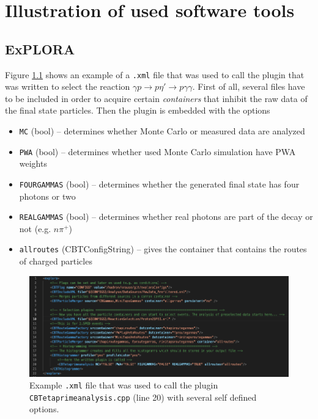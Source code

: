 \chapter{Illustration of used software tools}
\section{ExPLORA}
Figure \ref{fig:xml} shows an example of a \texttt{.xml} file that was used to call the plugin that was written to select the reaction $\gamma p\to p\eta'\to p\gamma\gamma$. First of all, several files have to be included in order to acquire certain \emph{containers} that inhibit the raw data of the final state particles. Then the plugin is embedded with the options 
\begin{itemize}
	\item \texttt{MC} (bool) -- determines whether Monte Carlo or measured data are analyzed 
	\item \texttt{PWA} (bool) -- determines whether used Monte Carlo simulation have PWA weights
	\item \texttt{FOURGAMMAS} (bool) -- determines whether the generated final state has four photons or two
	\item \texttt{REALGAMMAS} (bool) -- determines whether real photons are part of the decay or not (e.g. $n\pi^+$)
	\item \texttt{allroutes} (CBTConfigString) -- gives the container that contains the routes of charged particles
\end{itemize}
\begin{figure}[htbp]
	\centering
	\includegraphics[width=\linewidth]{../demonstration/new_gg.png}
	\caption{Example \texttt{.xml} file that was used to call the plugin \texttt{CBTetaprimeanalysis.cpp} (line 20) with several self defined options.}
	\label{fig:xml}
\end{figure}

